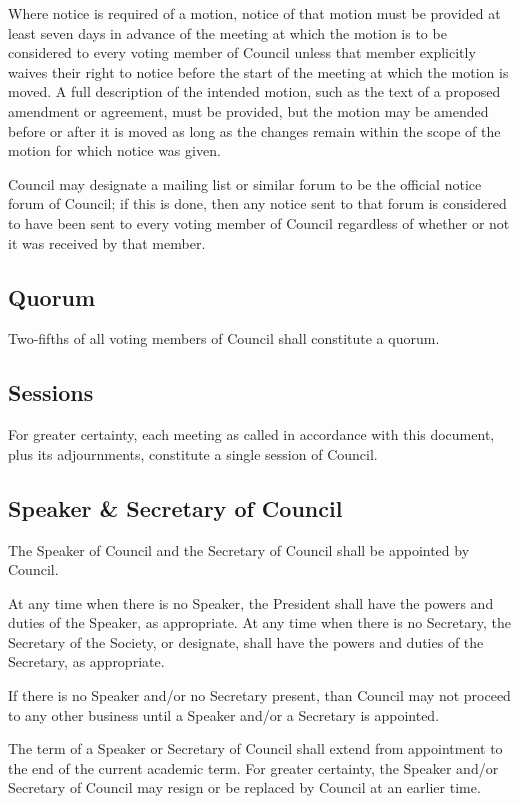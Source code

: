 Where notice is required of a motion, notice of that motion must be provided at
least seven days in advance of the meeting at which the motion is to be
considered to every voting member of Council unless that member
explicitly waives their right to notice before the start of the meeting at
which the motion is moved. A full description of the intended motion, such as
the text of a proposed amendment or agreement, must be provided, but the motion
may be amended before or after it is moved as long as the changes remain within
the scope of the motion for which notice was given.

Council may designate a mailing list or similar forum to be the
official notice forum of Council; if this is done, then any notice
sent to that forum is considered to have been sent to every voting member of
Council regardless of whether or not it was received by that member.

\subsection{Quorum}
Two-fifths of all voting members of Council shall constitute a
quorum.

\subsection{Sessions}
For greater certainty, each meeting as called in accordance with this document,
plus its adjournments, constitute a single session of Council.

\subsection{Speaker \& Secretary of Council}
The Speaker of Council and the Secretary of Council shall
be appointed by Council. 

At any time when there is no Speaker, the President shall have the powers and
duties of the Speaker, as appropriate.  At any time when there is no Secretary,
the Secretary of the Society, or designate, shall have the powers and duties of the
Secretary, as appropriate.

If there is no Speaker and/or no Secretary present, than Council may
not proceed to any other business until a Speaker and/or a Secretary is
appointed. 

The term of a Speaker or Secretary of Council shall extend from 
appointment to the end of the current academic term. For greater certainty,
the Speaker and/or Secretary of Council may resign or be replaced by
Council at an earlier time. 

